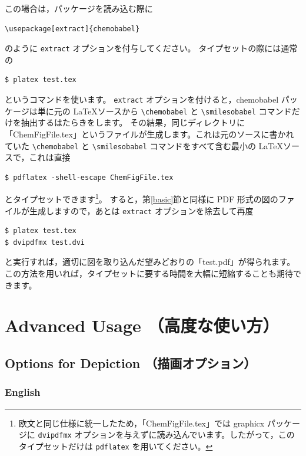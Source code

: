 \documentclass[12pt]{jsarticle}
\begin{document}
この場合は，パッケージを読み込む際に
\begin{verbatim}
\usepackage[extract]{chemobabel}
\end{verbatim}
のように \verb|extract| オプションを付与してください。
タイプセットの際には通常の
\begin{verbatim}
$ platex test.tex
\end{verbatim}
というコマンドを使います。
\verb|extract| オプションを付けると，\textsf{chemobabel} パッケージは単に元の \LaTeX ソースから \verb|\chemobabel| と \verb|\smilesobabel| コマンドだけを抽出するはたらきをします。
その結果，同じディレクトリに「ChemFigFile.tex」というファイルが生成します。これは元のソースに書かれていた \verb|\chemobabel| と \verb|\smilesobabel| コマンドをすべて含む最小の \LaTeX ソースで，これは直接
\begin{verbatim}
$ pdflatex -shell-escape ChemFigFile.tex
\end{verbatim}
とタイプセットできます\footnote{欧文と同じ仕様に統一したため，「ChemFigFile.tex」では \textsf{graphicx} パッケージに \texttt{dvipdfmx} オプションを与えずに読み込んでいます。したがって，このタイプセットだけは \texttt{pdflatex} を用いてください。}。
すると，第\ref{basic}節と同様に PDF 形式の図のファイルが生成しますので，あとは \verb|extract| オプションを除去して再度
\begin{verbatim}
$ platex test.tex
$ dvipdfmx test.dvi
\end{verbatim}
と実行すれば，適切に図を取り込んだ望みどおりの「test.pdf」が得られます。
この方法を用いれば，タイプセットに要する時間を大幅に短縮することも期待できます。

\clearpage

\section{Advanced Usage （高度な使い方）}

\subsection{Options for Depiction （描画オプション）} \label{depict}

\subsubsection{English}
\end{document}
